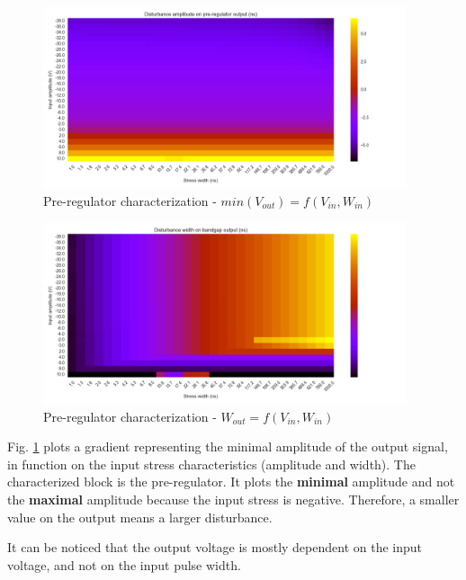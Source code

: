 \begin{figure}[!h]
  \centering
  \includegraphics[width=0.95\textwidth]{src/4/figures/vpre_cz_V2_amplitude.png}
  \caption{Pre-regulator characterization - $min(V_{out}) = f(V_{in}, W_{in})$}
  \label{fig:pre-reg-cz-v2-amp}
\end{figure}

\begin{figure}[!hp]
  \centering
  \includegraphics[width=0.95\textwidth]{src/4/figures/vpre_cz_V2_width.png}
  \caption{Pre-regulator characterization - $W_{out} = f(V_{in}, W_{in})$}
  \label{fig:pre-reg-cz-v2-width}
\end{figure}

Fig. \ref{fig:pre-reg-cz-v2-amp} plots a gradient representing the minimal amplitude of the output signal,
in function on the input stress characteristics (amplitude and width).
The characterized block is the pre-regulator.
It plots the \textbf{minimal} amplitude and not the \textbf{maximal} amplitude because the input stress is negative.
Therefore, a smaller value on the output means a larger disturbance.

It can be noticed that the output voltage is mostly dependent on the input voltage, and not on the input pulse width.

